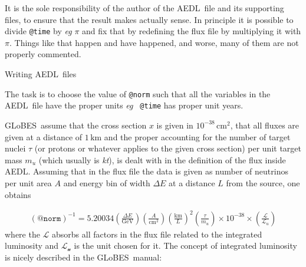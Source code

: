 \documentclass[12pt]{article}
\makeatletter
\renewcommand{\section}{\@startsection{section}{1}{0em}{-\baselineskip}%
{\baselineskip}{\normalfont\large\bfseries}}
\newcommand{\GLOBES}{{\sf GLoBES}}
\newcommand{\AEDL}{{\sf AEDL}}
\makeatother
\begin{document}
It is the sole responsibility of the author of the \AEDL\ file and its
supporting files, to ensure that the result makes actually sense. In
principle it is possible to divide {\tt @time}  by
{\it eg} $\pi$ and fix that by redefining the flux file by multiplying
it with $\pi$. Things like that happen and have happened, and worse,
many of them are not properly commented.
 
\section{Writing \AEDL\ files}

The task is to choose the value of  {\tt @norm} such that all the
variables in the \AEDL\ file have the proper units {\it eg} {\tt
  @time} has proper unit years.
 

\GLOBES\ assume that the cross
section $x$ is given in $10^{-38}\,\mathrm{cm}^2$, that all fluxes are
given at a distance of $1\,\mathrm{km}$ and the proper accounting for
the number of target nuclei $\tau$ (or protons or whatever applies to the
given cross section) per unit target mass $m_u$ (which usually is {\it
  kt}), is dealt with in the
definition of the flux inside \AEDL.  Assuming that in the flux file
the data is given as number of neutrinos per unit area $A$ and
energy bin of width $\Delta E$ at a distance $L$ from the source, one
obtains

\begin{eqnarray}
(\mathtt{@norm})^{-1}=5.20034\left(\frac{\Delta E}{\mathrm{GeV}}\right)\left(\frac{A}{\mathrm{cm}^2}\right)\left(\frac{\mathrm{km}}{L}\right)^2\left(\frac{\tau}{m_u}\right)\times10^{-38}\times\left(\frac{\mathcal{L}}{\mathcal{L}_u}\right)
\end{eqnarray}
where the $\mathcal{L}$ absorbs all factors in the flux file related to
the integrated luminosity and $\mathcal{L_u}$ is the unit chosen for
it.  The concept of integrated luminosity is
nicely described in the \GLOBES\ manual:
\end{document}
